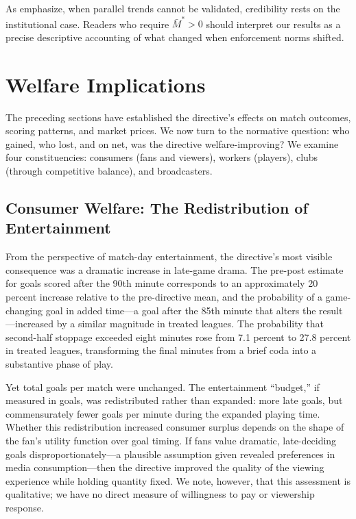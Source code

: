 \documentclass[12pt]{article}
\begin{document}
As \citet{roth2022pretest} emphasize, when parallel trends cannot be validated, credibility rests on the institutional case. Readers who require $\bar{M}^* > 0$ should interpret our results as a precise descriptive accounting of what changed when enforcement norms shifted.


\section{Welfare Implications}
\label{sec:welfare}

The preceding sections have established the directive's effects on match
outcomes, scoring patterns, and market prices. We now turn to the
normative question: who gained, who lost, and on net, was the directive
welfare-improving? We examine four constituencies: consumers (fans and
viewers), workers (players), clubs (through competitive balance), and
broadcasters.

\subsection{Consumer Welfare: The Redistribution of Entertainment}
\label{subsec:consumer}

From the perspective of match-day entertainment, the directive's most
visible consequence was a dramatic increase in late-game drama. The pre-post
estimate for goals scored after the 90th minute corresponds to an
approximately 20 percent increase relative to the pre-directive mean, and
the probability of a game-changing goal in added time---a goal after
the 85th minute that alters the result---increased by a
similar magnitude in treated leagues. The probability that second-half stoppage exceeded eight
minutes rose from 7.1 percent to 27.8 percent in treated leagues, transforming the final
minutes from a brief coda into a substantive phase of play.

Yet total goals per match were unchanged. The entertainment ``budget,'' if
measured in goals, was redistributed rather than expanded: more late goals,
but commensurately fewer goals per minute during the expanded playing
time. Whether this redistribution increased consumer surplus depends on
the shape of the fan's utility function over goal timing. If fans value
dramatic, late-deciding goals disproportionately---a plausible assumption
given revealed preferences in media consumption---then the directive
improved the quality of the viewing experience while holding quantity
fixed. We note, however, that this assessment is qualitative; we have no
direct measure of willingness to pay or viewership response.
\end{document}
